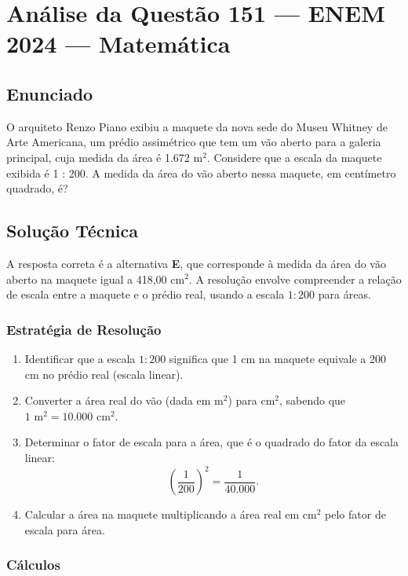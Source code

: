 \documentclass{article}
\begin{document}
\section*{Análise da Questão 151 — ENEM 2024 — Matemática}

\subsection*{Enunciado}
O arquiteto Renzo Piano exibiu a maquete da nova sede do Museu Whitney de Arte Americana, um prédio assimétrico que tem um vão aberto para a galeria principal, cuja medida da área é 1.672 m$^{2}$. Considere que a escala da maquete exibida é 1 : 200. A medida da área do vão aberto nessa maquete, em centímetro quadrado, é?

\subsection*{Solução Técnica}

A resposta correta é a alternativa \textbf{E}, que corresponde à medida da área do vão aberto na maquete igual a 418,00 cm$^{2}$. A resolução envolve compreender a relação de escala entre a maquete e o prédio real, usando a escala $1:200$ para áreas.

\subsubsection*{Estratégia de Resolução}

\begin{enumerate}
  \item Identificar que a escala $1:200$ significa que 1 cm na maquete equivale a 200 cm no prédio real (escala linear).
  \item Converter a área real do vão (dada em m$^{2}$) para cm$^{2}$, sabendo que $1 \text{ m}^{2} = 10.000 \text{ cm}^{2}$.
  \item Determinar o fator de escala para a área, que é o quadrado do fator da escala linear:
  \[
    (\frac{1}{200})^{2} = \frac{1}{40.000}.
  \]
  \item Calcular a área na maquete multiplicando a área real em cm$^{2}$ pelo fator de escala para área.
\end{enumerate}

\subsubsection*{Cálculos}
\end{document}
